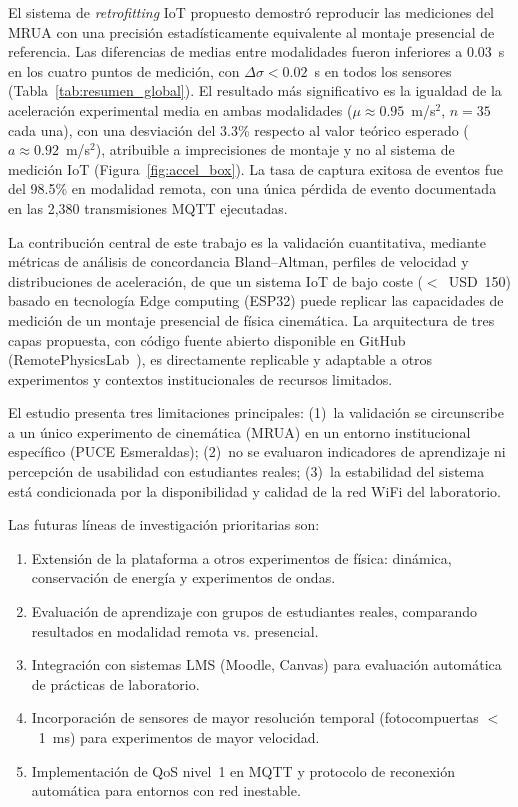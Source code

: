 \documentclass[journal,article,submit,pdftex]{Definitions/mdpi}
\begin{document}
El sistema de \textit{retrofitting} IoT propuesto demostr\'o reproducir las mediciones del MRUA con una precisi\'on estad\'isticamente equivalente al montaje presencial de referencia. Las diferencias de medias entre modalidades fueron inferiores a 0.03~s en los cuatro puntos de medici\'on, con $\Delta\sigma < 0.02$~s en todos los sensores (Tabla~\ref{tab:resumen_global}). El resultado m\'as significativo es la igualdad de la aceleraci\'on experimental media en ambas modalidades ($\mu \approx 0.95$~m/s$^2$, $n = 35$ cada una), con una desviaci\'on del 3.3\% respecto al valor te\'orico esperado ($a \approx 0.92$~m/s$^2$), atribuible a imprecisiones de montaje y no al sistema de medici\'on IoT (Figura~\ref{fig:accel_box}). La tasa de captura exitosa de eventos fue del 98.5\% en modalidad remota, con una \'unica p\'erdida de evento documentada en las 2,380 transmisiones MQTT ejecutadas.

La contribuci\'on central de este trabajo es la validaci\'on cuantitativa, mediante m\'etricas de an\'alisis de concordancia Bland--Altman, perfiles de velocidad y distribuciones de aceleraci\'on, de que un sistema IoT de bajo coste ($<$~USD~150) basado en tecnolog\'ia Edge computing (ESP32) puede replicar las capacidades de medici\'on de un montaje presencial de f\'isica cinem\'atica. La arquitectura de tres capas propuesta, con c\'odigo fuente abierto disponible en GitHub (RemotePhysicsLab~\cite{r15}), es directamente replicable y adaptable a otros experimentos y contextos institucionales de recursos limitados.

El estudio presenta tres limitaciones principales: (1)~la validaci\'on se circunscribe a un \'unico experimento de cinem\'atica (MRUA) en un entorno institucional espec\'ifico (PUCE Esmeraldas); (2)~no se evaluaron indicadores de aprendizaje ni percepci\'on de usabilidad con estudiantes reales; (3)~la estabilidad del sistema est\'a condicionada por la disponibilidad y calidad de la red WiFi del laboratorio.

Las futuras l\'ineas de investigaci\'on prioritarias son:
\begin{enumerate}[label=(\arabic*)]
  \item Extensi\'on de la plataforma a otros experimentos de f\'isica: din\'amica, conservaci\'on de energ\'ia y experimentos de ondas.
  \item Evaluaci\'on de aprendizaje con grupos de estudiantes reales, comparando resultados en modalidad remota vs. presencial.
  \item Integraci\'on con sistemas LMS (Moodle, Canvas) para evaluaci\'on autom\'atica de pr\'acticas de laboratorio.
  \item Incorporaci\'on de sensores de mayor resoluci\'on temporal (fotocompuertas $<$~1~ms) para experimentos de mayor velocidad.
  \item Implementaci\'on de QoS nivel~1 en MQTT y protocolo de reconexi\'on autom\'atica para entornos con red inestable.
\end{enumerate}
\end{document}
